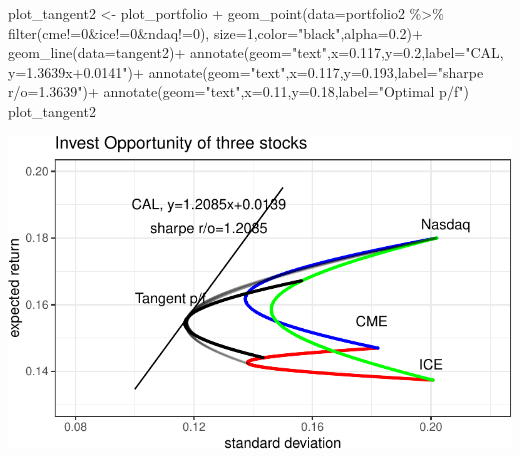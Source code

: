 \documentclass[
  letterpaper,
  DIV=11,
  numbers=noendperiod]{scrreprt}
\newenvironment{Shaded}{\begin{snugshade}}{\end{snugshade}}
\newcommand{\AttributeTok}[1]{\textcolor[rgb]{0.40,0.45,0.13}{#1}}
\newcommand{\DecValTok}[1]{\textcolor[rgb]{0.68,0.00,0.00}{#1}}
\newcommand{\FloatTok}[1]{\textcolor[rgb]{0.68,0.00,0.00}{#1}}
\newcommand{\FunctionTok}[1]{\textcolor[rgb]{0.28,0.35,0.67}{#1}}
\newcommand{\NormalTok}[1]{\textcolor[rgb]{0.00,0.23,0.31}{#1}}
\newcommand{\OtherTok}[1]{\textcolor[rgb]{0.00,0.23,0.31}{#1}}
\newcommand{\SpecialCharTok}[1]{\textcolor[rgb]{0.37,0.37,0.37}{#1}}
\newcommand{\StringTok}[1]{\textcolor[rgb]{0.13,0.47,0.30}{#1}}
\begin{document}
\begin{Shaded}
\begin{Highlighting}[]
\NormalTok{plot\_tangent2 }\OtherTok{\textless{}{-}}\NormalTok{ plot\_portfolio }\SpecialCharTok{+}
  \FunctionTok{geom\_point}\NormalTok{(}\AttributeTok{data=}\NormalTok{portfolio2 }\SpecialCharTok{\%\textgreater{}\%} \FunctionTok{filter}\NormalTok{(cme}\SpecialCharTok{!=}\DecValTok{0}\SpecialCharTok{\&}\NormalTok{ice}\SpecialCharTok{!=}\DecValTok{0}\SpecialCharTok{\&}\NormalTok{ndaq}\SpecialCharTok{!=}\DecValTok{0}\NormalTok{),}
             \AttributeTok{size=}\DecValTok{1}\NormalTok{,}\AttributeTok{color=}\StringTok{"black"}\NormalTok{,}\AttributeTok{alpha=}\FloatTok{0.2}\NormalTok{)}\SpecialCharTok{+}
  \FunctionTok{geom\_line}\NormalTok{(}\AttributeTok{data=}\NormalTok{tangent2)}\SpecialCharTok{+}
  \FunctionTok{annotate}\NormalTok{(}\AttributeTok{geom=}\StringTok{"text"}\NormalTok{,}\AttributeTok{x=}\FloatTok{0.117}\NormalTok{,}\AttributeTok{y=}\FloatTok{0.2}\NormalTok{,}\AttributeTok{label=}\StringTok{"CAL, y=1.3639x+0.0141"}\NormalTok{)}\SpecialCharTok{+}
  \FunctionTok{annotate}\NormalTok{(}\AttributeTok{geom=}\StringTok{"text"}\NormalTok{,}\AttributeTok{x=}\FloatTok{0.117}\NormalTok{,}\AttributeTok{y=}\FloatTok{0.193}\NormalTok{,}\AttributeTok{label=}\StringTok{"sharpe r/o=1.3639"}\NormalTok{)}\SpecialCharTok{+}
  \FunctionTok{annotate}\NormalTok{(}\AttributeTok{geom=}\StringTok{"text"}\NormalTok{,}\AttributeTok{x=}\FloatTok{0.11}\NormalTok{,}\AttributeTok{y=}\FloatTok{0.18}\NormalTok{,}\AttributeTok{label=}\StringTok{"Optimal p/f"}\NormalTok{)}
\NormalTok{plot\_tangent2}
\end{Highlighting}
\end{Shaded}

\includegraphics{investment_hw2_files/figure-pdf/unnamed-chunk-9-1.pdf}
\end{document}
